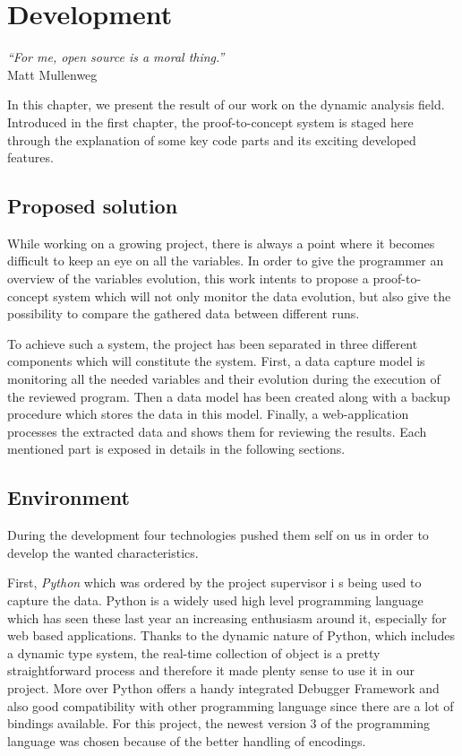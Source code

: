 

\chapter{Development} %
\label{chap:development}
\begin{flushright}
\textit{``For me, open source is a moral thing.''} \\ Matt Mullenweg
\end{flushright}

In this chapter, we present the result of our work on the dynamic analysis field. Introduced in the first chapter, the proof-to-concept system is staged here through the explanation of some key code parts and its exciting developed features.

\section{Proposed solution}
While working on a growing project, there is always a point where it becomes difficult to keep an eye on all the variables. In order to give the programmer an overview of the variables evolution, this work intents to propose a proof-to-concept system which will not only monitor the data evolution, but also give the possibility to compare the gathered data between different runs.

To achieve such a system, the project has been separated in three different components which will constitute the system. First, a data capture model is monitoring all the needed variables and their evolution during the execution of the reviewed program. Then a data model has been created along with a backup procedure which stores the data in this model. Finally, a web-application processes the extracted data and shows them for reviewing the results. Each mentioned part is exposed in details in the following sections.

\section{Environment}
During the development four technologies pushed them self on us in order to develop the wanted characteristics.

First, \textit{Python} which was ordered by the project supervisor i s being used to capture the data. Python is a widely used high level programming language which has seen these last year an increasing enthusiasm around it, especially for web based applications. Thanks to the dynamic nature of Python, which includes a dynamic type system, the real-time collection of object is a pretty straightforward process and therefore it made plenty sense to use it in our project. More over Python offers a handy integrated Debugger Framework and also good compatibility with other programming language since there are a lot of bindings available. For this project, the newest version 3 of the programming language was chosen because of the better handling of encodings.

